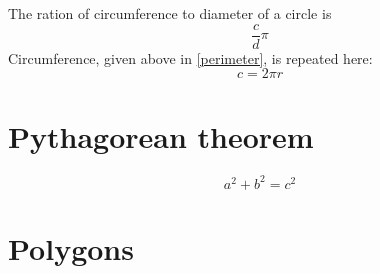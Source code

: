 The ration of circumference to diameter of a circle is 
\begin{equation}
    \frac{c}{d}\pi
\end{equation}
Circumference, given above in \ref{perimeter}, is repeated here:
\begin{equation}
    c = 2\pi r
\end{equation}

      \section{Pythagorean theorem}
\begin{equation}
    a^2 + b^2 = c^2
\end{equation}
      \section{Polygons}
